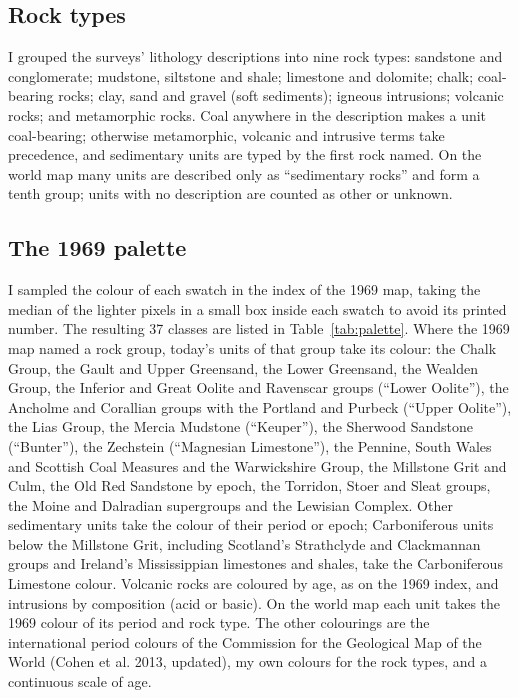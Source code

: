 \documentclass[11pt,a4paper]{article}
\begin{document}
\subsection{Rock types}

I grouped the surveys' lithology descriptions into nine rock types: sandstone and conglomerate; mudstone, siltstone and shale; limestone and dolomite; chalk; coal-bearing rocks; clay, sand and gravel (soft sediments); igneous intrusions; volcanic rocks; and metamorphic rocks. Coal anywhere in the description makes a unit coal-bearing; otherwise metamorphic, volcanic and intrusive terms take precedence, and sedimentary units are typed by the first rock named. On the world map many units are described only as ``sedimentary rocks'' and form a tenth group; units with no description are counted as other or unknown.

\subsection{The 1969 palette}

I sampled the colour of each swatch in the index of the 1969 map, taking the median of the lighter pixels in a small box inside each swatch to avoid its printed number. The resulting 37 classes are listed in Table~\ref{tab:palette}. Where the 1969 map named a rock group, today's units of that group take its colour: the Chalk Group, the Gault and Upper Greensand, the Lower Greensand, the Wealden Group, the Inferior and Great Oolite and Ravenscar groups (``Lower Oolite''), the Ancholme and Corallian groups with the Portland and Purbeck (``Upper Oolite''), the Lias Group, the Mercia Mudstone (``Keuper''), the Sherwood Sandstone (``Bunter''), the Zechstein (``Magnesian Limestone''), the Pennine, South Wales and Scottish Coal Measures and the Warwickshire Group, the Millstone Grit and Culm, the Old Red Sandstone by epoch, the Torridon, Stoer and Sleat groups, the Moine and Dalradian supergroups and the Lewisian Complex. Other sedimentary units take the colour of their period or epoch; Carboniferous units below the Millstone Grit, including Scotland's Strathclyde and Clackmannan groups and Ireland's Mississippian limestones and shales, take the Carboniferous Limestone colour. Volcanic rocks are coloured by age, as on the 1969 index, and intrusions by composition (acid or basic). On the world map each unit takes the 1969 colour of its period and rock type. The other colourings are the international period colours of the Commission for the Geological Map of the World (Cohen et al. 2013, updated), my own colours for the rock types, and a continuous scale of age.
\end{document}
